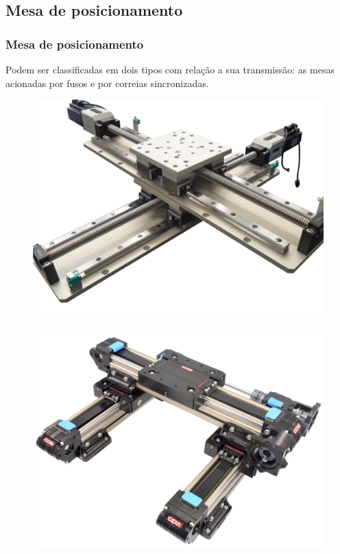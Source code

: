 \subsection{Mesa de posicionamento}

\begin{frame}
\frametitle{Mesa de posicionamento}

Podem ser classificadas em dois tipos com relação a sua transmissão: as mesas acionadas por fusos e por correias sincronizadas.

\begin{figure}
\centering
\includegraphics[scale = 0.12]{figs/mfuso}
\end{figure}

\begin{figure}
\centering
\includegraphics[scale = 0.03]{figs/mcorreia}
\end{figure}
    
\end{frame}
    

